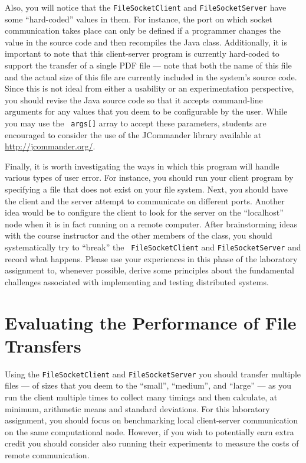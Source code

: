 Also, you will notice that the {\tt FileSocketClient} and {\tt FileSocketServer} have some ``hard-coded'' values in
them. For instance, the port on which socket communication takes place can only be defined if a programmer changes the
value in the source code and then recompiles the Java class. Additionally, it is important to note that this
client-server program is currently hard-coded to support the transfer of a single PDF file --- note that both the name
of this file and the actual size of this file are currently included in the system's source code.  Since this is not
ideal from either a usability or an experimentation perspective, you should revise the Java source code so that it
accepts command-line arguments for any values that you deem to be configurable by the user. While you may use the {\tt
args[]} array to accept these parameters, students are encouraged to consider the use of the JCommander library
available at \url{http://jcommander.org/}.

Finally, it is worth investigating the ways in which this program will handle various types of user error. For instance,
you should run your client program by specifying a file that does not exist on your file system. Next, you should have
the client and the server attempt to communicate on different ports. Another idea would be to configure the client to
look for the server on the ``localhost'' node when it is in fact running on a remote computer. After brainstorming ideas with
the course instructor and the other members of the class, you should systematically try to ``break'' the {\tt
FileSocketClient} and {\tt FileSocketServer} and record what happens. Please use your experiences in this phase of the
laboratory assignment to, whenever possible, derive some principles about the fundamental challenges associated with
implementing and testing distributed systems.

\section*{Evaluating the Performance of File Transfers}

Using the {\tt FileSocketClient} and {\tt FileSocketServer} you should transfer multiple files --- of sizes that you
deem to the ``small'', ``medium'', and ``large'' --- as you run the client multiple times to collect many timings and
then calculate, at minimum, arithmetic means and standard deviations.  For this laboratory assignment, you should focus
on benchmarking local client-server communication on the same computational node. However, if you wish to potentially
earn extra credit you should consider also running their experiments to measure the costs of remote communication.


